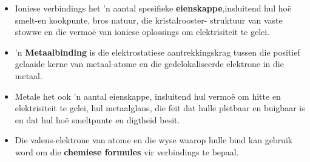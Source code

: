 \begin{itemize}[noitemsep]
\label{m38689*uid152}\item Ioniese verbindings het  'n aantal spesifieke \textbf{eienskappe},insluitend hul hoë smelt-en kookpunte, bros natuur, die kristalrooster- struktuur van vaste stowwe en die vermo\"{e} van ioniese oplossings om elektrisiteit te gelei.
\label{m38689*uid153}\item  'n \textbf{Metaalbinding} is die elektrostatiese aantrekkingskrag tussen die positief gelaaide kerne van metaal-atome en die gedelokaliseerde elektrone in die metaal.
\label{m38689*uid154}\item Metale het ook  'n aantal eienskappe, insluitend hul vermo\"{e} om hitte en elektrisiteit te gelei, hul metaalglans, die feit dat hulle pletbaar en buigbaar is en dat hul ho\"{e} smeltpunte en digtheid besit.
\label{m38689*uid155}\item Die valens-elektrone van atome en die wyse waarop hulle bind kan gebruik word om die \textbf{chemiese formules} vir verbindings te bepaal.
\end{itemize}
\label{m38689*secfhsst!!!underscore!!!id1181}
